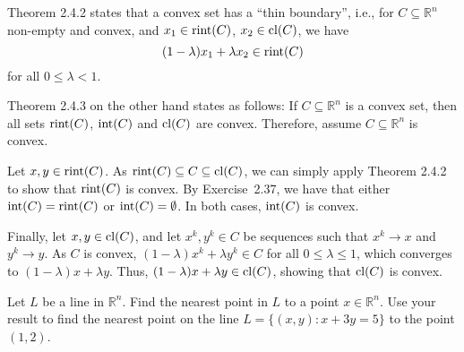 \documentclass[
  a4paper,
  12pt,
]{article}
\numberwithin{equation}{section}
\begin{document}
\begin{solution}
  Theorem 2.4.2 states that a convex set has a ``thin boundary'', i.e., for $C \subseteq \mathbb{R}^n$ non-empty and convex, and $x_1 \in \operatorname*{rint}(C)$, $x_2 \in \operatorname*{cl}(C)$, we have
  \begin{equation}
    (1 - \lambda) x_1 + \lambda x_2 \in \operatorname*{rint}(C)
  \end{equation}
  for all $0 \leq \lambda < 1$.

  Theorem 2.4.3 on the other hand states as follows:
  If $C \subseteq \mathbb{R}^n$ is a convex set, then all sets $\operatorname*{rint}(C)$, $\operatorname*{int}(C)$ and $\operatorname*{cl}(C)$ are convex.
  Therefore, assume $C \subseteq \mathbb{R}^n$ is convex.

  Let $x, y \in \operatorname*{rint}(C)$.
  As $\operatorname*{rint}(C) \subseteq C \subseteq \operatorname*{cl}(C)$, we can simply apply Theorem 2.4.2 to show that $\operatorname*{rint}(C)$ is convex.
  By Exercise~2.37, we have that either $\operatorname*{int}(C) = \operatorname*{rint}(C)$ or $\operatorname*{int}(C) = \emptyset$.
  In both cases, $\operatorname*{int}(C)$ is convex.

  Finally, let $x, y \in \operatorname*{cl}(C)$,
  and let $x^k, y^k \in C$ be sequences such that $x^k \to x$ and $y^k \to y$.
  As $C$ is convex, $(1 - \lambda) x^k + \lambda y^k \in C$ for all $0 \leq \lambda \leq 1$, which converges to $(1 - \lambda) x + \lambda y$.
  Thus, $(1 - \lambda) x + \lambda y \in \operatorname*{cl}(C)$, showing that $\operatorname*{cl}(C)$ is convex.
\end{solution}

\setcounter{section}{3}

\begin{exercise}
  Let $L$ be a line in $\mathbb{R}^n$.
  Find the nearest point in $L$ to a point $x \in \mathbb{R}^n$.
  Use your result to find the nearest point on the line $L = \{ (x, y) : x + 3y = 5 \}$ to the point $(1, 2)$.
\end{exercise}
\end{document}
